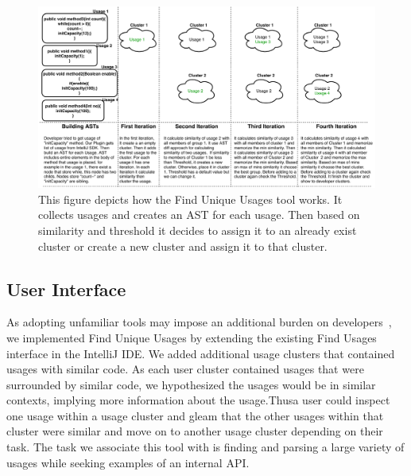 \documentclass[conference]{IEEEtran}
\begin{document}
\begin{figure}
    \centering
    \includegraphics [width=\textwidth,keepaspectratio,clip]{figures/Generalview}
    \caption{This figure depicts how the Find Unique Usages tool works. It collects usages and creates an AST for each usage. Then based on similarity and threshold it decides to assign it to an already exist cluster or create a new cluster and assign it to that cluster. }
\label{fig:general}
\end{figure}


\subsection{User Interface} 
As adopting unfamiliar tools may impose an additional burden on developers~\cite{adaption2002}, we implemented Find Unique Usages by extending the existing Find Usages interface in the IntelliJ IDE. We added additional usage clusters that contained usages with similar code. As each user cluster contained usages that were surrounded by similar code, we hypothesized the usages would be in similar contexts, implying more information about the usage.Thusa user could inspect one usage within a usage cluster and gleam that the other usages within that cluster were similar and move on to another usage cluster depending on their task. The task we associate this tool with is finding and parsing a large variety of usages while seeking examples of an internal API.
\end{document}
